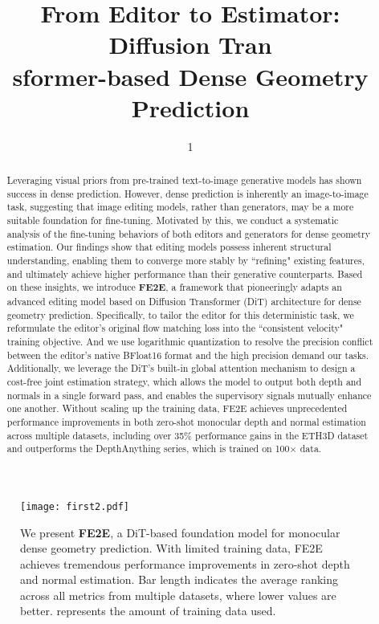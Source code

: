 \documentclass{article} %
\title{\textbf{From Editor to Estimator}: Diffusion Tran\\sformer-based Dense Geometry Prediction}
\author{1}
\begin{document}
\maketitle
\vspace{-2em}
\begin{figure}[h]
   \centering
   \vspace{-1em}
   \texttt{[image: first2.pdf]} 
   \vspace{-1em}
   \caption{We present \textbf{FE2E}, a DiT-based foundation model for monocular dense geometry prediction. With limited training data, FE2E achieves tremendous performance improvements in zero-shot depth and normal estimation. Bar length indicates the average ranking across all metrics from multiple datasets, where lower values are better.  represents the amount of training data used.}
   \label{fig:first}
   \vspace{-1em}
\end{figure}

\begin{abstract}
  \vspace{-1em}
   Leveraging visual priors from pre-trained text-to-image generative models has shown success in dense prediction. However, dense prediction is inherently an image-to-image task, suggesting that image editing models, rather than generators, may be a more suitable foundation for fine-tuning.
   Motivated by this, we conduct a systematic analysis of the fine-tuning behaviors of both editors and generators for dense geometry estimation. Our findings show that editing models possess inherent structural understanding, enabling them to converge more stably by ``refining" existing features, and ultimately achieve higher performance than their generative counterparts.
   Based on these insights, we introduce \textbf{FE2E}, a framework that pioneeringly adapts an advanced editing model based on Diffusion Transformer (DiT) architecture for dense geometry prediction. Specifically, to tailor the editor for this deterministic task, we reformulate the editor's original flow matching loss into the ``consistent velocity" training objective. And we use logarithmic quantization to resolve the precision conflict between the editor's native BFloat16 format and the high precision demand our tasks.
   Additionally, we leverage the DiT's built-in global attention mechanism to design a cost-free joint estimation strategy, which allows the model to output both depth and normals in a single forward pass, and enables the supervisory signals mutually enhance one another. Without scaling up the training data, FE2E achieves unprecedented performance improvements in both zero-shot monocular depth and normal estimation across multiple datasets, including over 35\% performance gains in the ETH3D dataset and outperforms the DepthAnything series, which is trained on 100$\times$ data.
\end{abstract}
\end{document}
